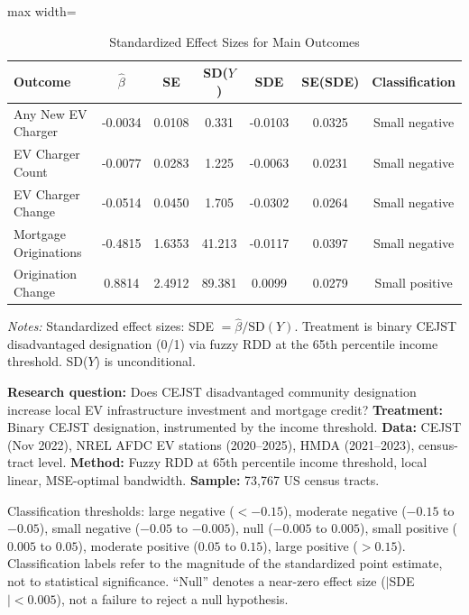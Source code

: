 \begin{table}[H]
\centering
\caption{Standardized Effect Sizes for Main Outcomes}
\label{tab:sde}
\begin{adjustbox}{max width=\textwidth}
\begin{tabular}{lcccccc}
\toprule
Outcome & $\hat{\beta}$ & SE & SD($Y$) & SDE & SE(SDE) & Classification \\
\midrule
Any New EV Charger & -0.0034 & 0.0108 & 0.331 & -0.0103 & 0.0325 & Small negative \\
EV Charger Count & -0.0077 & 0.0283 & 1.225 & -0.0063 & 0.0231 & Small negative \\
EV Charger Change & -0.0514 & 0.0450 & 1.705 & -0.0302 & 0.0264 & Small negative \\
Mortgage Originations & -0.4815 & 1.6353 & 41.213 & -0.0117 & 0.0397 & Small negative \\
Origination Change & 0.8814 & 2.4912 & 89.381 & 0.0099 & 0.0279 & Small positive \\
\bottomrule
\end{tabular}
\end{adjustbox}
\par\vspace{0.3em}
{\footnotesize \emph{Notes:} Standardized effect sizes: SDE $= \hat{\beta} / \text{SD}(Y)$. Treatment is binary CEJST disadvantaged designation (0/1) via fuzzy RDD at the 65th percentile income threshold. SD($Y$) is unconditional.

\textbf{Research question:} Does CEJST disadvantaged community designation increase local EV infrastructure investment and mortgage credit?
\textbf{Treatment:} Binary CEJST designation, instrumented by the income threshold.
\textbf{Data:} CEJST (Nov 2022), NREL AFDC EV stations (2020--2025), HMDA (2021--2023), census-tract level.
\textbf{Method:} Fuzzy RDD at 65th percentile income threshold, local linear, MSE-optimal bandwidth.
\textbf{Sample:} 73,767 US census tracts.

Classification thresholds: large negative ($< -0.15$), moderate negative ($-0.15$ to $-0.05$),
small negative ($-0.05$ to $-0.005$), null ($-0.005$ to $0.005$),
small positive ($0.005$ to $0.05$), moderate positive ($0.05$ to $0.15$),
large positive ($> 0.15$).
Classification labels refer to the magnitude of the standardized point estimate,
not to statistical significance. ``Null'' denotes a near-zero effect size
($|$SDE$| < 0.005$), not a failure to reject a null hypothesis.}
\end{table}

